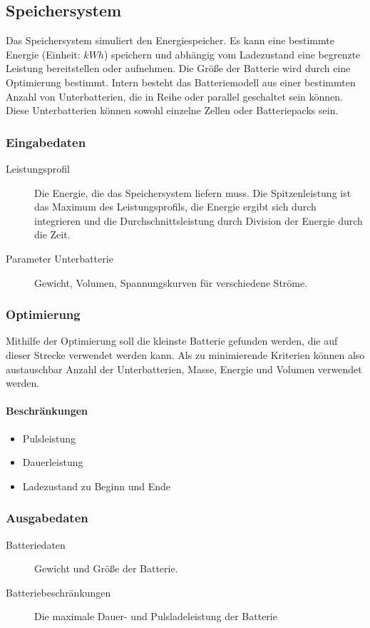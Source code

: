 \subsection{Speichersystem}
Das Speichersystem simuliert den Energiespeicher. Es kann eine bestimmte Energie (Einheit: $kWh$) speichern und abhängig vom Ladezustand eine begrenzte Leistung bereitstellen oder aufnehmen. Die Größe der Batterie wird durch eine Optimierung bestimmt. Intern besteht das Batteriemodell aus einer bestimmten Anzahl von Unterbatterien, die in Reihe oder parallel geschaltet sein können. Diese Unterbatterien können sowohl einzelne Zellen oder Batteriepacks sein.

\subsubsection{Eingabedaten}
\begin{description}
	\item[Leistungsprofil] Die Energie, die das Speichersystem liefern muss. Die Spitzenleistung ist das Maximum des Leistungsprofils, die Energie ergibt sich durch integrieren und die Durchschnittsleistung durch Division der Energie durch die Zeit. 
	\item[Parameter Unterbatterie] Gewicht, Volumen, Spannungskurven für verschiedene Ströme.
\end{description}

\subsubsection{Optimierung}
Mithilfe der Optimierung soll die kleinste Batterie gefunden werden, die auf dieser Strecke verwendet werden kann. Als zu minimierende Kriterien können also austauschbar Anzahl der Unterbatterien, Masse, Energie und Volumen verwendet werden.
\paragraph{Beschränkungen}
\begin{itemize}
	\item Pulsleistung
	\item Dauerleistung
	\item Ladezustand zu Beginn und Ende 
\end{itemize}

\subsubsection{Ausgabedaten}
\begin{description}
	\item[Batteriedaten] Gewicht und Größe der Batterie.
	\item[Batteriebeschränkungen] Die maximale Dauer- und Pulsladeleistung der Batterie
\end{description}

